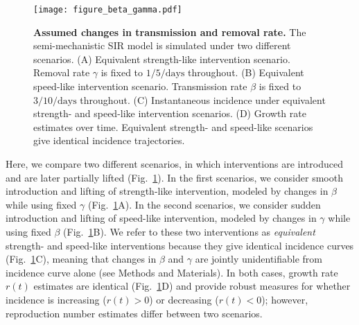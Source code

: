 \documentclass[12pt]{article}
\newcommand{\fref}[1]{Fig.~\ref{fig:#1}}
\begin{document}
\begin{figure}[!ht]
\texttt{[image: figure\_beta\_gamma.pdf]}
\caption{
\textbf{Assumed changes in transmission and removal rate.}
The semi-mechanistic SIR model is simulated under two different scenarios.
(A) Equivalent strength-like intervention scenario.
Removal rate $\gamma$ is fixed to $1/5/\textrm{days}$ throughout.
(B) Equivalent speed-like intervention scenario.
Transmission rate $\beta$ is fixed to $3/10/\textrm{days}$ throughout.
(C) Instantaneous incidence under equivalent strength- and speed-like intervention scenarios.
(D) Growth rate estimates over time.
Equivalent strength- and speed-like scenarios give identical incidence trajectories.
}
\label{fig:assumption}
\end{figure}

Here, we compare two different scenarios, in which interventions are introduced and are later partially lifted (\fref{assumption}).
In the first scenarios, we consider smooth introduction and lifting of strength-like intervention, modeled by changes in $\beta$ while using fixed $\gamma$ (\fref{assumption}A).
In the second scenarios, we consider sudden introduction and lifting of speed-like intervention, modeled by changes in $\gamma$ while using fixed $\beta$ (\fref{assumption}B).
We refer to these two interventions as \emph{equivalent} strength- and speed-like interventions because they give identical incidence curves (\fref{assumption}C), meaning that changes in $\beta$ and $\gamma$ are jointly unidentifiable from incidence curve alone (see Methods and Materials).
In both cases, growth rate $r(t)$ estimates are identical (\fref{assumption}D) and provide robust measures for whether incidence is increasing ($r(t) > 0$) or decreasing ($r(t) < 0$); however, reproduction number estimates differ between two scenarios.
\end{document}
